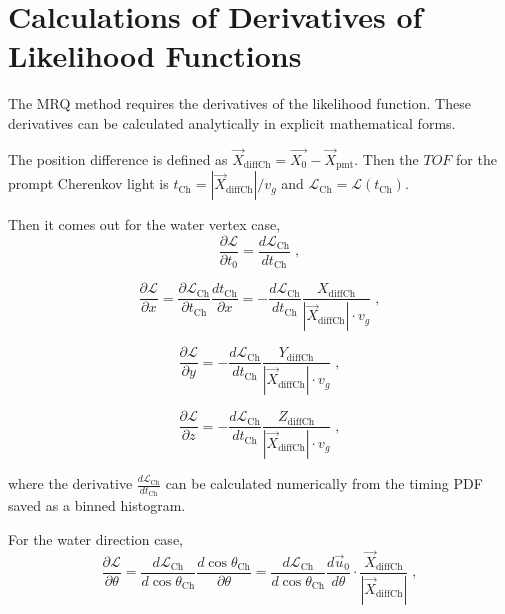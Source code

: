 \section{Calculations of Derivatives of Likelihood Functions}\label{appendix:likelihoodCalcu}
The MRQ method requires the derivatives of the likelihood function. These derivatives can be calculated analytically in explicit mathematical forms.

The position difference is defined as $\vec{X}_{{\mathrm{diffCh}}} = \vec{X_0}-\vec{X}_{\mathrm{pmt}}$. Then the $TOF$ for the prompt Cherenkov light is $t_{\mathrm{Ch}}=|\vec{X}_{{\mathrm{diffCh}}}|/v_g$ and $\mathcal{L}_{\mathrm{Ch}}=\mathcal{L}(t_{\mathrm{Ch}})$.

Then it comes out for the water vertex case,
\begin{equation}
\frac{\partial \mathcal{L}}{\partial t_0}=\frac{d\mathcal{L}_{\mathrm{Ch}}}{dt_{\mathrm{Ch}}} \;,
\end{equation}

\begin{equation}
\frac{\partial \mathcal{L}}{\partial x}=\frac{\partial \mathcal{L}_{\mathrm{Ch}}}{\partial t_{\mathrm{Ch}}}\frac{dt_{\mathrm{Ch}}}{\partial x}=-\frac{d\mathcal{L}_{\mathrm{Ch}}}{dt_{\mathrm{Ch}}}\frac{X_{{\mathrm{diffCh}}}}{|\vec{X}_{{\mathrm{diffCh}}}|\cdot v_g} \;,
\end{equation}

\begin{equation}
\frac{\partial \mathcal{L}}{\partial y}=-\frac{d\mathcal{L}_{\mathrm{Ch}}}{dt_{\mathrm{Ch}}}\frac{Y_{{\mathrm{diffCh}}}}{|\vec{X}_{{\mathrm{diffCh}}}|\cdot v_g}\; ,
\end{equation}

\begin{equation}
\frac{\partial \mathcal{L}}{\partial z}=-\frac{d\mathcal{L}_{\mathrm{Ch}}}{dt_{\mathrm{Ch}}}\frac{Z_{{\mathrm{diffCh}}}}{|\vec{X}_{{\mathrm{diffCh}}}|\cdot v_g}\; ,
\end{equation}

where the derivative $\frac{d\mathcal{L}_{\mathrm{Ch}}}{dt_{\mathrm{Ch}}}$ can be calculated numerically from the timing PDF saved as a binned histogram.

For the water direction case,
\begin{equation}
\frac{\partial \mathcal{L}}{\partial\theta}=\frac{d\mathcal{L}_{\mathrm{Ch}}}{d\cos\theta_{\mathrm{Ch}}}\frac{d\cos\theta_{\mathrm{Ch}}}{\partial\theta}
=\frac{d\mathcal{L}_{\mathrm{Ch}}}{d\cos\theta_{\mathrm{Ch}}}\frac{d\vec{u}_0}{d\theta}\cdot\frac{\vec{X}_{{\mathrm{diffCh}}}}{|\vec{X}_{{\mathrm{diffCh}}}|}\; ,
\end{equation}

